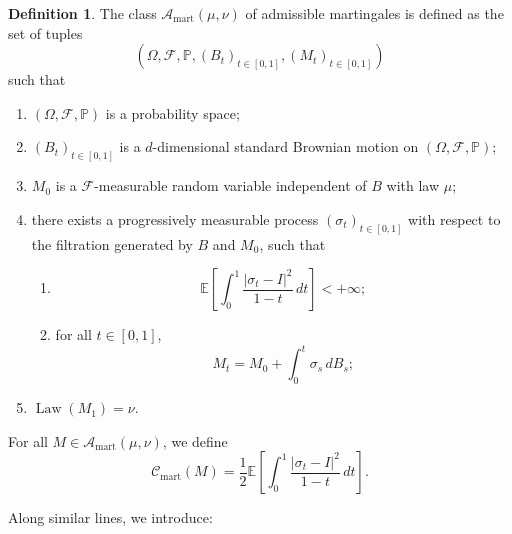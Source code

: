 \documentclass[reqno, a4paper]{amsart}
\theoremstyle{plain}
\theoremstyle{definition}
\newtheorem{definition}[theorem]{Definition}
\theoremstyle{remark}
\numberwithin{equation}{section}
\numberwithin{theorem}{section}
\newcommand{\E}{\mathbb{E}}
\newcommand{\Law}{\operatorname{Law}}
\begin{document}
	
	\begin{definition}\label{def:class_mart}
		The class $\mathcal A_{\mathrm{mart}}(\mu,\nu)$ of admissible martingales is defined as the set of tuples
		\[
		\left(\Omega,\mathcal F,\mathbb P,(B_t)_{t \in [0,1]},(M_t)_{t \in [0,1]}\right)
		\]
		such that
		\begin{enumerate}
			\item $(\Omega,\mathcal F,\mathbb P)$ is a probability space;
			\item $(B_t)_{t \in [0,1]}$ is a $d$-dimensional standard Brownian motion on $(\Omega,\mathcal F,\mathbb P)$;
			\item  $M_0$ is a $\mathcal F$-measurable random variable independent of $B$ with law $\mu$;
			\item\label{point:condition_volatility} there exists a progressively measurable process $(\sigma_t)_{t \in [0,1]}$ with respect to the filtration generated by $B$ and $M_0$, such that
			\begin{enumerate}
				\item
				\[
				\E\!\left[\int_0^1 \frac{|\sigma_t-I|^2}{1-t}\,dt\right]<+\infty;
				\]
				\item for all $t\in[0,1]$,
				\[
				M_t=M_0+\int_0^t \sigma_s\,dB_s;
				\]
			\end{enumerate}
			\item\label{point:law_mart} $\Law(M_1)= \nu.$
		\end{enumerate}
		For all $M\in\mathcal A_{\mathrm{mart}}(\mu,\nu)$, we define
		\[
		\mathcal C_{\mathrm{mart}}(M) 
		=\frac12 \E\!\left[\int_0^1 \frac{|\sigma_t-I|^2}{1-t}\,dt\right].
		\]
	\end{definition}
	
	Along similar lines, we introduce:
	
\end{document}
